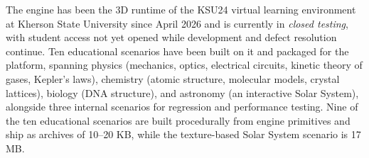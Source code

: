 The engine has been the 3D runtime of the KSU24 virtual learning environment at Kherson State University since April 2026 and is currently in \emph{closed testing}, with student access not yet opened while development and defect resolution continue. Ten educational scenarios have been built on it and packaged for the platform, spanning physics (mechanics, optics, electrical circuits, kinetic theory of gases, Kepler's laws), chemistry (atomic structure, molecular models, crystal lattices), biology (DNA structure), and astronomy (an interactive Solar System), alongside three internal scenarios for regression and performance testing. Nine of the ten educational scenarios are built procedurally from engine primitives and ship as archives of 10--20 KB, while the texture-based Solar System scenario is 17 MB.